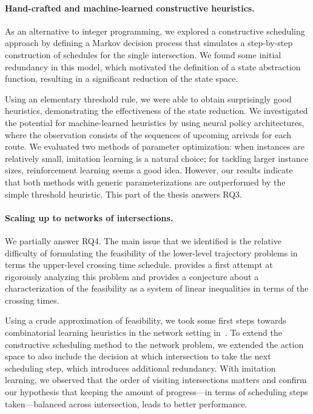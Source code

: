 \documentclass{report}
\theoremstyle{definition}
\theoremstyle{plain}
\begin{document}
\paragraph{Hand-crafted and machine-learned constructive heuristics.}

As an alternative to integer programming, we explored a constructive scheduling
approach by defining a Markov decision process that simulates a step-by-step
construction of schedules for the single intersection.
%
We found some initial redundancy in this model, which motivated the definition
of a state abstraction function, resulting in a significant reduction of the
state space.

Using an elementary threshold rule, we were able to obtain surprisingly good
heuristics, demonstrating the effectiveness of the state reduction.
%
We investigated the potential for machine-learned heuristics by using neural
policy architectures, where the observation consists of the sequences of
upcoming arrivals for each route. We evaluated two methods of parameter
optimization:
%
when instances are relatively small, imitation learning is a natural choice; for
tackling larger instance sizes, reinforcement learning seems a good idea.
%
However, our results indicate that both methods with generic parameterizations
are outperformed by the simple threshold heuristic.
%
This part of the thesis answers RQ3.

\paragraph{Scaling up to networks of intersections.}

We partially answer RQ4. The main issue that we identified is the relative
difficulty of formulating the feasibility of the lower-level trajectory problems
in terms the upper-level crossing time schedule.
%
 provides a first attempt at rigorously analyzing
this problem and provides a conjecture about a characterization of the
feasibility as a system of linear inequalities in terms of the crossing times.

Using a crude approximation of feasibility, we took some first steps towards
combinatorial learning heuristics in the network setting
in~.
%
To extend the constructive scheduling method to the network problem, we extended
the action space to also include the decision at which intersection to take the
next scheduling step, which introduces additional redundancy.
%
With imitation learning, we observed that the order of visiting intersections
matters and confirm our hypothesis that keeping the amount of progress---in
terms of scheduling steps taken---balanced across intersection, leads to better
performance.
\end{document}
